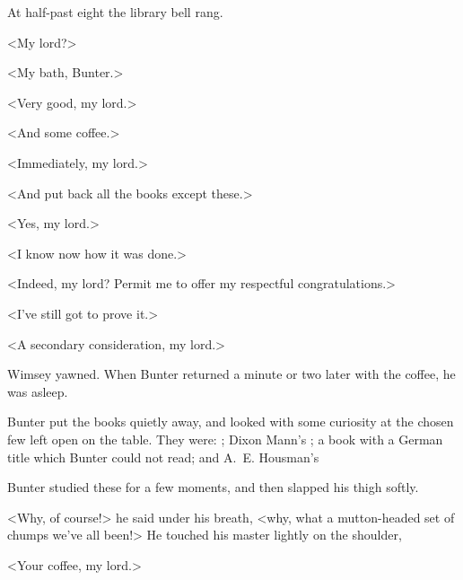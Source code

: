 At half-past eight the library bell rang.

<My lord?>

<My bath, Bunter.>

<Very good, my lord.>

<And some coffee.>

<Immediately, my lord.>

<And put back all the books except these.>

<Yes, my lord.>

<I know now how it was done.>

<Indeed, my lord? Permit me to offer my respectful congratulations.>

<I've still got to prove it.>

<A secondary consideration, my lord.>

Wimsey yawned. When Bunter returned a minute or two later with the coffee, he was asleep.

Bunter put the books quietly away, and looked with some curiosity at the chosen few left open on the table. They were: ; Dixon Mann's ; a book with a German title which Bunter could not read; and A\@.~E\@. Housman's 

Bunter studied these for a few moments, and then slapped his thigh softly.

<Why, of course!> he said under his breath, <why, what a mutton-headed set of chumps we've all been!> He touched his master lightly on the shoulder,

<Your coffee, my lord.>